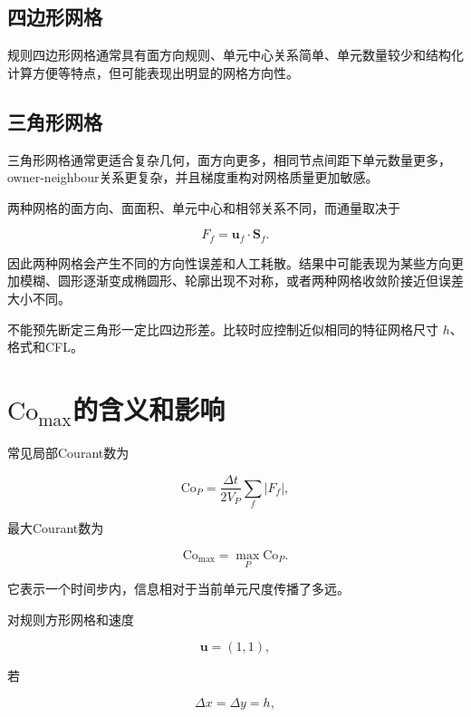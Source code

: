 \documentclass[UTF8,12pt,a4paper,fontset=fandol]{ctexart}
\newcommand{\Co}{\mathrm{Co}}
\newcommand{\Cmax}{\mathrm{Co}_{\max}}
\begin{document}
\subsection{四边形网格}

规则四边形网格通常具有面方向规则、单元中心关系简单、单元数量较少和结构化计算方便等特点，但可能表现出明显的网格方向性。

\subsection{三角形网格}

三角形网格通常更适合复杂几何，面方向更多，相同节点间距下单元数量更多，owner-neighbour关系更复杂，并且梯度重构对网格质量更加敏感。

两种网格的面方向、面面积、单元中心和相邻关系不同，而通量取决于

\begin{equation}
F_f=\bm u_f\cdot\bm S_f.
\end{equation}

因此两种网格会产生不同的方向性误差和人工耗散。结果中可能表现为某些方向更加模糊、圆形逐渐变成椭圆形、轮廓出现不对称，或者两种网格收敛阶接近但误差大小不同。

不能预先断定三角形一定比四边形差。比较时应控制近似相同的特征网格尺寸 $h$、格式和CFL。

\section{\texorpdfstring{$\Cmax$}{Co\_max}的含义和影响}

常见局部Courant数为

\begin{equation}
\Co_P
=
\frac{\Delta t}{2V_P}
\sum_f|F_f|,
\end{equation}

最大Courant数为

\begin{equation}
\Cmax
=
\max_P\Co_P.
\end{equation}

它表示一个时间步内，信息相对于当前单元尺度传播了多远。

对规则方形网格和速度

\begin{equation}
\bm u=(1,1),
\end{equation}

若

\begin{equation}
\Delta x=\Delta y=h,
\end{equation}
\end{document}
